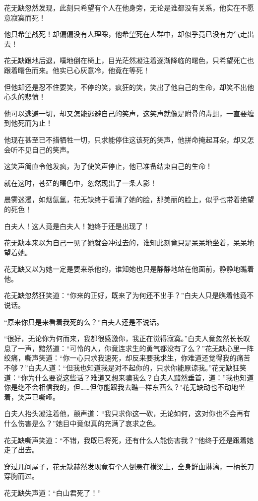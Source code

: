\documentclass[12pt,oneside]{book}
\begin{document}
花无缺忽然发现，此刻只希望有个人在他身旁，无论是谁都没有关系，他实在不愿意寂寞而死！

他只希望战死！却偏偏没有人理睬，他希望死在人群中，却似乎竟已没有力气走出去！

花无缺跟地后退，噗地倒在椅上，目光茫然凝注着逐渐降临的曙色，只希望死亡也跟着曙色而来。他实已心灰意冷，他竟在等死！

但他却还是忍不住要笑，不停的笑，疯狂的笑，笑出了他自己的生命，却笑不出他心头的悲愤！

他可以逃避一切，却又怎能逃避自己的笑声，这笑声就像是附骨的毒蛆，一直要缠到他死而为止！

他现在甚至已不措牺牲一切，只求能停住这该死的笑声，他拼命掩起耳朵，却又怎会听不见自己的笑声。

这笑声简直令他发疯，为了使笑声停止，他已准备结束自己的生命！

就在这时，苍茫的曙色中，忽然现出了一条人影！

晨雾迷漫，如烟氤氲，花无缺终于看清了她的脸，那美丽的脸上，似乎也带着绝望的死色！

白夫人！这人竟是白夫人！她终于还是出现了！

花无缺本来以为自己一见了她就会冲过去的，谁知此刻竟只是呆呆地坐着，呆呆地望着她。

花无缺又以为她一定是要来杀他的，谁知她也只是静静地站在他面前，静静地瞧着他。

花无缺忽然狂笑道：``你来的正好，既来了为何还不出手？''白夫人只是瞧着他竟不说话。

``原来你只是来看着我死的么？''白夫人还是不说话。

``很好，无论你为何而来，我都很感激你，我正在觉得寂寞。''白夫人竟忽然长长叹息了一声，黯然道：``可怜的人，你竟连求生的勇气都没有了么？''花无缺心里一阵绞痛，嘶声笑道：``你一心只求我速死，却反来要我求生，你难道还觉得我的痛苦不够？''白夫人道：``但我也知道我是对不起你的，只求你能原谅我。''花无缺狂笑道：``你为什么要说这些话？难道又想来骗我么？白夫人黯然垂首，道：''我也知道你是绝不会相信我的，但\ldots\ldots 但你能跟我去瞧一样东西么？"花无缺动也不动地坐着，笑声已嘶哑。

白夫人抬头凝注着他，颤声道：``我只求你这一砍，无论如何，这对你也不会再有什么伤害是么？''她目中竟似真的充满了哀求之色。

花无缺嘶声笑道：``不错，我既已将死，还有什么人能伤害我？''他终于还是跟着她走了出去。

穿过几间屋子，花无缺赫然发现竟有个人倒悬在横梁上，全身鲜血淋漓，一柄长刀穿胸而过。

花无缺失声道：``白山君死了！''
\end{document}
